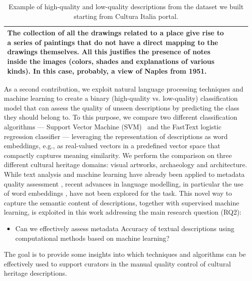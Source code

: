 \documentclass[epsfig,a4paper,12pt,titlepage]{book}
\begin{document}
\begin{table}[h!]
\begin{tabular}{|p{1.3cm}|p{1.8cm}|p{5.8cm}|p{5.8cm}|}
			The collection of all the drawings related to a place give rise to a series of paintings that do not have a direct mapping to the drawings themselves. All this justifies the presence of notes inside the images (colors, shades and explanations of various kinds). In this case, probably, a view of Naples from 1951.    \\
			\hline
		\end{tabular}
		\caption{Example of high-quality and low-quality  descriptions from the dataset we built starting from   Cultura Italia portal.}
		\label{tab:examples}       %
	\end{table}



As a second contribution, we exploit natural language processing techniques and machine learning to create a binary (high-quality vs. low-quality) classification model that can assess the quality of unseen descriptions by predicting the class they should belong to. To this purpose, we compare two different classification algorithms --- Support Vector Machine (SVM)~\cite{10.1023/A:1022627411411} and  the FastText logistic regression classifier \cite{joulin-etal-2017-bag} --- leveraging the representation of descriptions as word embeddings, e.g., as real-valued vectors in a predefined vector space that compactly captures meaning similarity. We perform the comparison on three different cultural heritage domains: visual artworks, archaeology and architecture. 
While text analysis and machine learning have already been applied to metadata quality assessment \cite{10.1145/1255175.1255248}, recent advances in language modelling, in particular the use of word embeddings \cite{mikolov-etal-2013-linguistic}, have not been explored for the task. This novel way to capture the semantic content of descriptions, together with supervised machine learning, is exploited in this work addressing the main research question (RQ2):
\begin{itemize}
    \item Can we effectively assess metadata Accuracy of textual descriptions using computational methods based on machine learning?
\end{itemize}
 
The goal is to provide some insights into which techniques and algorithms can be effectively used to support curators in the manual quality control of cultural heritage descriptions. 
\end{document}
